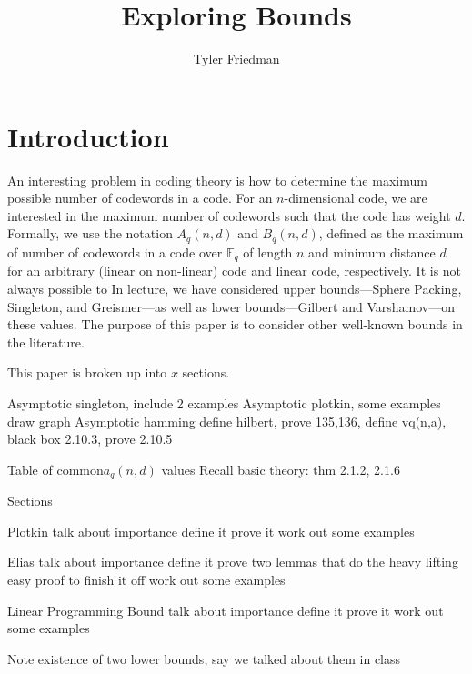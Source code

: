 \documentclass{article}
\title{Exploring Bounds}
\author{Tyler Friedman}
\begin{document}
\maketitle

\section{Introduction}

An interesting problem in coding theory is how to determine the maximum possible
number of codewords in a code.  For an $n$-dimensional code, we are interested in 
the maximum number of codewords such that the code has weight $d$.  
Formally, we use the notation $A_q(n,d)$
and $B_q(n,d)$, defined as the maximum of number of codewords in a code over
$\mathbb{F}_q$ of length $n$ and minimum distance $d$ for an arbitrary (linear
on non-linear) code and linear code, respectively.  It is not always possible to In lecture, we have
considered upper bounds---Sphere Packing, Singleton, and Greismer---as well as
lower bounds---Gilbert and Varshamov---on these values.  The purpose of this
paper is to consider other well-known bounds in the literature.

This paper is broken up into $x$ sections.

Asymptotic singleton, include 2 examples
Asymptotic plotkin, some examples
draw graph
Asymptotic hamming
	define hilbert, prove 135,136, define vq(n,a),
	black box 2.10.3, prove 2.10.5


Table of common$a_q(n,d)$ values
Recall basic theory: thm 2.1.2, 2.1.6

Sections

Plotkin
talk about importance
define it
prove it
work out some examples

Elias
talk about importance
define it
prove two lemmas that do the heavy lifting
easy proof to finish it off
work out some examples

Linear Programming Bound
talk about importance
define it
prove it
work out some examples


Note existence of two lower bounds, say we talked about them in class
\end{document}
